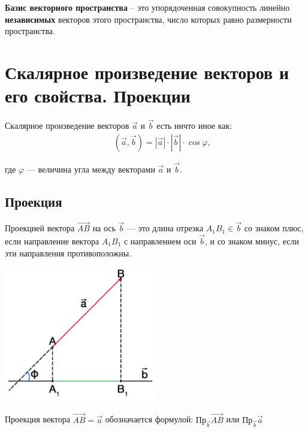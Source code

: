 \documentclass[12pt, fleqn]{extarticle}
\begin{document}
\textbf{Базис векторного пространства} – это упорядоченная совокупность линейно \textbf{независимых} векторов этого пространства, число которых равно размерности пространства.

\newpage

\section{Скалярное произведение векторов и его свойства. Проекции}\label{sec:scalar-multiply}

Скалярное произведение векторов \(\overrightarrow{a}\) и \(\overrightarrow{b}\) есть ничто иное как:
\begin{align*}
     &  &
    (\overrightarrow{a}, \overrightarrow{b}) = |\overrightarrow{a}| \cdot |\overrightarrow{b}| \cdot \cos{\varphi},
\end{align*}

где \(\varphi\) — величина угла между векторами \(\overrightarrow{a}\) и \(\overrightarrow{b}\).

\subsection*{Проекция}

Проекцией вектора \(\overrightarrow{AB}\) на ось \(\overrightarrow{b}\) — это длина отрезка \(A_1B_1 \in \overrightarrow{b}\) со знаком плюс, если направление вектора \(A_1B_1\) с направлением оси \(\overrightarrow{b}\), и со знаком минус, если эти направления противоположны.

\begin{center}
    \includegraphics[width=0.5\textwidth]{projection.png}
\end{center}

Проекция вектора \(\overrightarrow{AB} = \overrightarrow{a}\) обозначается формулой: \(\text{Пр}_{\overrightarrow{b}}\overrightarrow{AB}\) или \(\text{Пр}_{\overrightarrow{b}}\overrightarrow{a}\)
\end{document}
